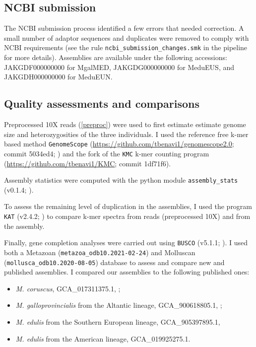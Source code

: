 \documentclass[11pt, a4paper]{article}
\begin{document}
\subsection{NCBI submission}

The NCBI submission process identified a few errors that needed correction.
A small number of adaptor sequences and duplicates were removed to comply with NCBI requirements
(see the rule \texttt{ncbi\_submission\_changes.smk} in the pipeline for more details).
Assemblies are available under the following accessions: 
JAKGDF000000000 for MgalMED,
JAKGDG000000000 for MeduEUS,
and JAKGDH000000000 for MeduEUN.


\subsection{Quality assessments and comparisons}

Preprocessed 10X reads (\cref{preproc}) were used to first estimate estimate genome size and heterozygosities of the three individuals.
I used the reference free k-mer based method \texttt{GenomeScope} (\url{https://github.com/tbenavi1/genomescope2.0}; commit 5034ed4; \cite{Ranallo-Benavidez2020}) and the fork of the \texttt{KMC} k-mer  counting program (\url{https://github.com/tbenavi1/KMC}; commit 1df71f6).

Assembly statistics were computed with the python module \texttt{assembly\_stats} (v0.1.4; \cite{Trizna2020}).

To assess the remaining level of duplication in the assemblies, I used the program \texttt{KAT} (v2.4.2; \cite{Mapleson2017}) to compare k-mer spectra from reads (preprocessed 10X) and from the assembly.

Finally, gene completion analyses were carried out using \texttt{BUSCO} (v5.1.1; \cite{Manni2021}).
I used both a Metazoan (\texttt{metazoa\_odb10.2021-02-24}) and Molluscan (\texttt{mollusca\_odb10.2020-08-05}) database to assess and compare new and published assemblies.
I compared our assemblies to the following published ones:
\begin{itemize}
	\item \textit{M. coruscus}, GCA\_017311375.1, \textcite{Yang2021};
	\item \textit{M. galloprovincialis} from the Altantic lineage, GCA\_900618805.1, \textcite{Gerdol2020};
	\item \textit{M. edulis} from the Southern European lineage, GCA\_905397895.1, \textcite{Corrochano-Fraile2022}
	\item \textit{M. edulis} from the American lineage, GCA\_019925275.1.
\end{itemize}
\end{document}
